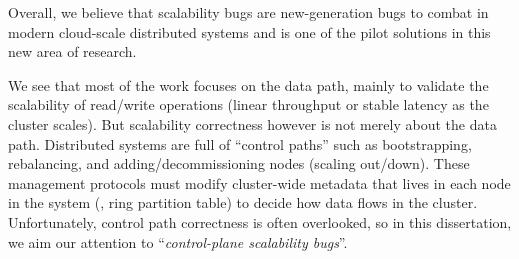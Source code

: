 Overall, we believe that scalability bugs are new-generation bugs to combat in
modern cloud-scale distributed systems and \sck is one of the pilot solutions in
this new area of research.

We see that most of the work \cite{Calotoiu+13-ApmScaleBug,
Laguna+15-DebugAtScale, Shudler+15-ExascaleLib, Wang+14-Exalt, Zhou+11-Vrisha,
Zhou+13-Wukong} focuses on the data path, mainly to validate the scalability of
read/write operations (linear throughput or stable latency as the cluster
scales). But scalability correctness however is not merely about the data path.
Distributed systems are full of ``control paths'' such as bootstrapping,
rebalancing, and adding/decommissioning nodes (scaling out/down). These
management protocols must modify cluster-wide metadata that lives in each node
in the system (\eg, ring partition table) to decide how data flows in the
cluster. Unfortunately, control path correctness is often overlooked, so in this
dissertation, we aim our attention to ``{\em control-plane scalability bugs}''.
\fi
